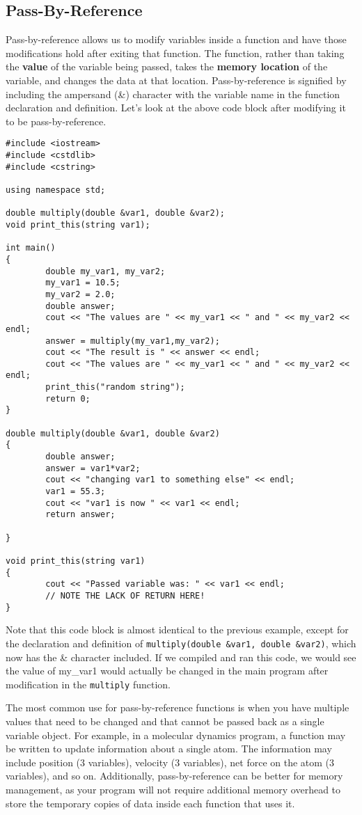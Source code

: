 \subsection*{Pass-By-Reference}
Pass-by-reference allows us to modify variables inside a function and have those modifications hold after exiting that function.  The function, rather than taking the \textbf{value} of the variable being passed, takes the \textbf{memory location} of the variable, and changes the data at that location.  Pass-by-reference is signified by including the ampersand (\&) character with the variable name in the function declaration and definition.  Let's look at the above code block after modifying it to be pass-by-reference.

\begin{verbatim}
#include <iostream>
#include <cstdlib>
#include <cstring>

using namespace std;

double multiply(double &var1, double &var2);
void print_this(string var1);

int main()
{
        double my_var1, my_var2;
        my_var1 = 10.5;
        my_var2 = 2.0;
        double answer;
        cout << "The values are " << my_var1 << " and " << my_var2 << endl;
        answer = multiply(my_var1,my_var2);
        cout << "The result is " << answer << endl;
        cout << "The values are " << my_var1 << " and " << my_var2 << endl;
        print_this("random string");
        return 0;
}

double multiply(double &var1, double &var2)
{
        double answer;
        answer = var1*var2;
        cout << "changing var1 to something else" << endl;
        var1 = 55.3;
        cout << "var1 is now " << var1 << endl;
        return answer;

}

void print_this(string var1)
{
        cout << "Passed variable was: " << var1 << endl;
        // NOTE THE LACK OF RETURN HERE!
}
\end{verbatim}

Note that this code block is almost identical to the previous example, except for the declaration and definition of \texttt{multiply(double \&var1, double \&var2)}, which now has the \& character included.  If we compiled and ran this code, we would see the value of my\_var1 would actually be changed in the main program after modification in the \texttt{multiply} function.

The most common use for pass-by-reference functions is when you have multiple values that need to be changed and that cannot be passed back as a single variable object.  For example, in a molecular dynamics program, a function may be written to update information about a single atom.  The information may include position (3 variables), velocity (3 variables), net force on the atom (3 variables), and so on.  Additionally, pass-by-reference can be better for memory management, as your program will not require additional memory overhead to store the temporary copies of data inside each function that uses it.

